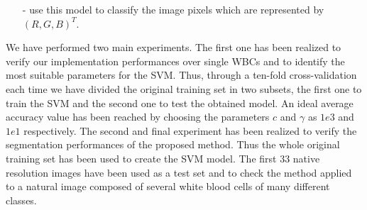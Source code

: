 {\begin{itemize}
		\item[-] use this model to classify the image pixels which are represented by $(R,G,B)^T.$
	\end{itemize}    
	We have performed two main experiments. The first one has been realized to verify our implementation performances over single WBCs and to identify the most suitable parameters for the SVM. Thus, through a ten-fold cross-validation each time we have divided the original training set in two subsets, the first one to train the SVM and the second one to test the obtained model. An ideal average accuracy value has been reached by choosing the parameters $c$ and $\gamma$ as $1e3$ and $1e1$ respectively. 
	The second and final experiment has been realized to verify the segmentation performances of the proposed method. Thus the whole original training set has been used to create the SVM model. The first 33 native resolution images have been used as a test set and to check the method applied to a natural image composed of several white blood cells of many different classes. 
	
}
